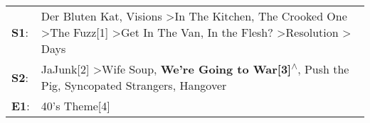 \begin{supertabular}{p{0.03\textwidth}p{0.92\textwidth}}
 \textbf{S1}:  &  Der Bluten Kat\textsuperscript{}, \enspace Visions\textsuperscript{} \textgreater \enspace In The Kitchen\textsuperscript{}, \enspace The Crooked One\textsuperscript{} \textgreater \enspace The Fuzz[1]\textsuperscript{} \textgreater \enspace Get In The Van\textsuperscript{}, \enspace In the Flesh?\textsuperscript{} \textgreater \enspace Resolution\textsuperscript{} \textgreater {} Days\textsuperscript{}  \enspace  \\
 \textbf{S2}:  &                                                                                                                                                  JaJunk[2]\textsuperscript{} \textgreater \enspace Wife Soup\textsuperscript{}, \enspace \textbf{We're Going to War[3]\textsuperscript{$\wedge$}}, \enspace Push the Pig\textsuperscript{}, \enspace Syncopated Strangers\textsuperscript{}, \enspace Hangover\textsuperscript{}  \enspace  \\
 \textbf{E1}:  &                                                                                                                                                                                                                                                                                                                                                                                                  40's Theme[4]\textsuperscript{}  \enspace  \\
\end{supertabular}
